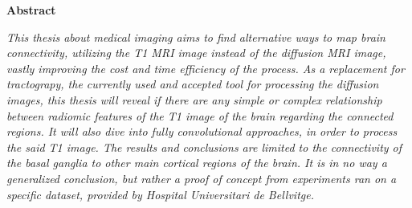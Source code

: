 \thispagestyle{plain}
\begin{center}
    \Large
    \textbf{Abstract}
\end{center}
\textit{This thesis about medical imaging aims to find alternative ways to map brain connectivity, utilizing the T1 MRI image instead of the diffusion MRI image, vastly improving the cost and time efficiency of the process. As a replacement for tractograpy, the currently used and accepted tool for processing the diffusion images, this thesis will reveal if there are any simple or complex relationship between radiomic features of the T1 image of the brain regarding the connected regions. It will also dive into fully convolutional approaches, in order to process the said T1 image. The results and conclusions are limited to the connectivity of the basal ganglia to other main cortical regions of the brain. It is in no way a generalized conclusion, but rather a proof of concept from experiments ran on a specific dataset, provided by Hospital Universitari de Bellvitge.}